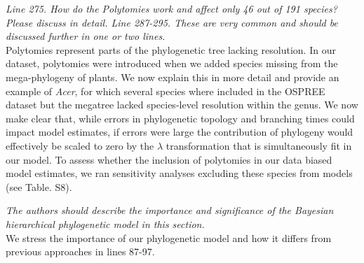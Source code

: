 \documentclass[11pt]{article}
\begin{document}
\emph{Line 275. How do the Polytomies work and affect only 46 out of 191 species? Please discuss in detail. Line 287-295. These are very common and should be discussed further in one or two lines.}\\
Polytomies represent parts of the phylogenetic tree lacking resolution. In our dataset, polytomies were introduced when we added species missing from the mega-phylogeny of plants. We now explain this in more detail and provide an example of \emph{Acer}, for which several species where included in the OSPREE dataset but the megatree lacked species-level resolution within the genus. We now make clear that, while errors in phylogenetic topology and branching times could impact model estimates, if errors were large the contribution of phylogeny would effectively be scaled to zero by the $\lambda$ transformation that is simultaneously fit in our model. To assess whether the inclusion of polytomies in our data biased model estimates, we ran sensitivity analyses excluding these species from models (see Table. S8). %



\emph{The authors should describe the importance and significance of the Bayesian hierarchical phylogenetic model in this section.}\\
We stress the importance of our phylogenetic model and how it differs from previous approaches in lines 87-97.
\end{document}
